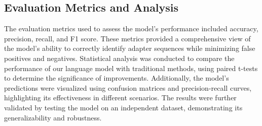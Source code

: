 \documentclass[pdflatex, sn-mathphys-num, lineno]{sn-jnl}%
\theoremstyle{thmstyleone}%
\theoremstyle{thmstyletwo}%
\theoremstyle{thmstylethree}%
\begin{document}
\subsection{Evaluation Metrics and Analysis}

The evaluation metrics used to assess the model's performance included accuracy, precision, recall, and F1 score.
These metrics provided a comprehensive view of the model's ability to correctly identify adapter sequences while minimizing false positives and negatives.
Statistical analysis was conducted to compare the performance of our language model with traditional methods, using paired t-tests to determine the significance of improvements.
Additionally, the model's predictions were visualized using confusion matrices and precision-recall curves, highlighting its effectiveness in different scenarios.
The results were further validated by testing the model on an independent dataset, demonstrating its generalizability and robustness.




\end{document}
